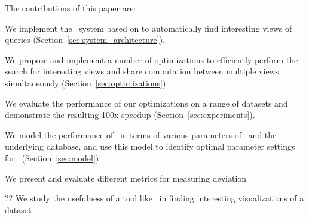The contributions of this paper are:
\squishlist
  \item We implement the \SeeDB\ system based on \cite{DBLP:conf/vldb/Parameswaran2013} to
  automatically find interesting views of queries (Section~\ref{sec:system_architecture}).
  \item We propose and implement a number of optimizations to
  efficiently perform the search for interesting views and share
  computation between multiple views simultaneously (Section~\ref{sec:optimizations}).
  \item We evaluate the performance of our optimizations on a range of datasets
  and demonstrate the resulting 100x speedup (Section~\ref{sec:experiments}).
  \item We model the performance of \SeeDB\ in terms of various parameters of
  \SeeDB\ and the underlying database, and use this model to identify optimal
  parameter settings for \SeeDB\ (Section~\ref{sec:model}).
  \item We present and evaluate different metrics for measuring deviation
  \item ?? We study the usefulness of a tool like \SeeDB\ in finding
  interesting visualizations of a dataset
\squishend









